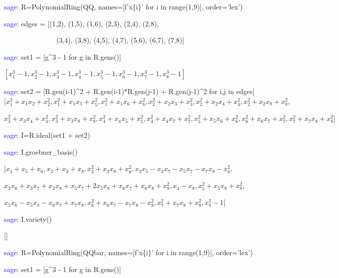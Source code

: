 \documentclass{beamer}
\begin{document}
\begin{frame}

\begin{semiverbatim}
\scriptsize
\textcolor{blue}{sage:} R=PolynomialRing(QQ, names=[f'x\{i\}' for i in range(1,9)], order='lex')

\textcolor{blue}{sage:} edges = [(1,2), (1,5), (1,6), (2,3), (2,4), (2,8),

\ \ \ \ \ \ \ \ \ \ \ \ \ \ \        (3,4), (3,8), (4,5), (4,7), (5,6), (6,7), (7,8)]


\textcolor{blue}{sage:} set1 = [g\^{}3 - 1 for g in R.gens()]

$\left[x_{1}^{3} - 1, x_{2}^{3} - 1, x_{3}^{3} - 1, x_{4}^{3} - 1, x_{5}^{3} - 1, x_{6}^{3} - 1, x_{7}^{3} - 1, x_{8}^{3} - 1\right]$


\textcolor{blue}{sage:} set2 = [R.gen(i-1)\^{}2 + R.gen(i-1)*R.gen(j-1) + R.gen(j-1)\^{}2 for i,j in edges]
$[x_{1}^{2} + x_{1} x_{2} + x_{2}^{2}, x_{1}^{2} + x_{1} x_{5} + x_{5}^{2}, x_{1}^{2} + x_{1} x_{6} + x_{6}^{2}, x_{2}^{2} + x_{2} x_{3} + x_{3}^{2}, x_{2}^{2} + x_{2} x_{4} + x_{4}^{2}, x_{2}^{2} + x_{2} x_{8} + x_{8}^{2},$

$x_{3}^{2} + x_{3} x_{4} + x_{4}^{2}, x_{3}^{2} + x_{3} x_{8} + x_{8}^{2}, x_{4}^{2} + x_{4} x_{5} + x_{5}^{2}, x_{4}^{2} + x_{4} x_{7} + x_{7}^{2}, x_{5}^{2} + x_{5} x_{6} + x_{6}^{2}, x_{6}^{2} + x_{6} x_{7} + x_{7}^{2}, x_{7}^{2} + x_{7} x_{8} + x_{8}^{2}]$

\textcolor{blue}{sage:} I=R.ideal(set1 + set2)

\textcolor{blue}{sage:} I.groebner\_basis()

$[x_{1} + x_{5} + x_{6}, x_{2} + x_{3} + x_{8}, x_{3}^{2} + x_{3} x_{8} + x_{8}^{2}, x_{3} x_{5} - x_{3} x_{7} - x_{5} x_{7} - x_{7} x_{8} - x_{8}^{2},$

$x_{3} x_{6} + x_{3} x_{7} + x_{3} x_{8} + x_{5} x_{7} + 2 x_{5} x_{8} + x_{6} x_{7} + x_{6} x_{8} + x_{8}^{2}, x_{4} - x_{8}, x_{5}^{2} + x_{5} x_{8} + x_{8}^{2},$

$x_{5} x_{6} - x_{5} x_{8} - x_{6} x_{7} + x_{7} x_{8}, x_{6}^{2} + x_{6} x_{7} - x_{7} x_{8} - x_{8}^{2}, x_{7}^{2} + x_{7} x_{8} + x_{8}^{2}, x_{8}^{3} - 1]$

\textcolor{blue}{sage:} I.variety()

[]



\textcolor{blue}{sage:} R=PolynomialRing(QQbar, names=[f'x\{i\}' for i in range(1,9)], order='lex')

\textcolor{blue}{sage:} set1 = [g\^{}3 - 1 for g in R.gens()]


\end{semiverbatim}
\end{frame}
\end{document}
